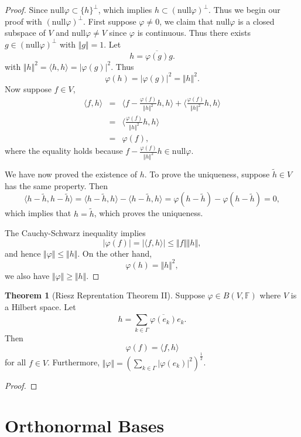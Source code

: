 \documentclass[12pt]{book}
\theoremstyle{definition}
\newtheorem{theorem}{Theorem}[chapter]
\newcommand{\inner}[2]{{\langle #1,#2\rangle}}
\newcommand{\F}{\mathbb{F}}
\newcommand{\nullspace}{\mathrm{null}}
\newcommand{\Sum}[2]{{\sum_{#1}^{#2}}}
\begin{document}
\begin{proof}
Since $\nullspace \varphi \subset \{h\}^\perp$, which implies ${h}\subset (\nullspace \varphi)^\perp$. Thus we begin our proof with $(\nullspace \varphi)^\perp$. First suppose $\varphi \neq 0$, we claim that $\nullspace \varphi$ is a closed subspace of $V$ and $\nullspace \varphi \neq V$ since $\varphi$ is continuous.
Thus there exists $g \in (\nullspace \varphi)^\perp$ with $\Vert g\Vert=1$. Let
$$
h = \overline{\varphi(g)}g. 
$$
with $\Vert h\Vert^2=\inner{h}{h}=|\varphi(g)|^2$. Thus 
$$
\varphi(h) = |\varphi(g)|^2 = \Vert h \Vert^2.
$$
Now suppose $f \in V$,
\begin{eqnarray*}
	\inner{f}{h} &=& \inner{f-\frac{\varphi(f)}{\Vert h\Vert^2}h}{h} + \inner{\frac{\varphi(f)}{\Vert h\Vert^2}h}{h} \\
	&=& \inner{\frac{\varphi(f)}{\Vert h\Vert^2}h}{h} \\
	&=& \varphi(f),
\end{eqnarray*}
where the equality holds because $f-\frac{\varphi(f)}{\Vert h\Vert^2}h \in \nullspace \varphi$. \par
We have now proved the existence of $h$. To prove the uniqueness, suppose $\tilde h\in V$ has the same property. Then 
$$
\inner{h-\tilde h}{h - \tilde h}=\inner{h-\tilde h}{h}-\inner{h-\tilde h}{h}=\varphi(h-\tilde h)-\varphi(h-\tilde h)=0,
$$
which implies that $h=\tilde h$, which proves the uniqueness. \par
The Cauchy-Schwarz inequality implies 
$$
|\varphi(f)| = |\inner{f}{h}| \leq \Vert f\Vert \Vert h\Vert,
$$
and hence $\Vert \varphi \Vert \leq\Vert h \Vert$. On the other hand, 
$$
\varphi(h)=\Vert h\Vert^2, 
$$
we also have $\Vert \varphi \Vert \geq \Vert h \Vert$.
\end{proof}


\begin{theorem}[Riesz Reprentation Theorem II]\label{Riesz Reprentation Theorem II}
Suppose $\varphi \in B(V,\F)$ where $V$ is a Hilbert space. Let 
$$
h = \Sum{k\in \Gamma}{} \overline{\varphi(e_k)}e_k.
$$
Then 
$$
\varphi(f) = \inner{f}{h}
$$
for all $f\in V$. Furthermore, $\Vert \varphi \Vert=(\Sum{k\in \Gamma}{}|\varphi(e_k)|^2  )^{\frac{1}{2}}$.
\end{theorem}
\begin{proof}
	
\end{proof}






\section{Orthonormal Bases} \ \\
\end{document}
